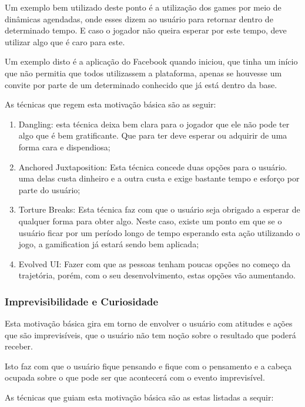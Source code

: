 Um exemplo bem utilizado deste ponto é a utilização dos games por meio de dinâmicas
agendadas, onde esses dizem ao usuário para retornar dentro de determinado tempo.
E caso o jogador não queira esperar por este tempo, deve utilizar algo que é caro
para este.

Um exemplo disto é a aplicação do Facebook quando iniciou, que tinha um início que não permitia
que todos utilizassem a plataforma, apenas se houvesse um convite por parte de um
determinado conhecido que já está dentro da base.

As técnicas que regem esta motivação básica são as seguir:

\begin{enumerate}
    \item Dangling: esta técnica deixa bem clara para o jogador que ele não pode
        ter algo que é bem gratificante. Que para ter deve esperar ou adquirir
        de uma forma cara e dispendiosa;
    \item Anchored Juxtaposition: Esta técnica concede duas opções para o usuário.
        uma delas custa dinheiro e a outra custa e exige bastante tempo e esforço
        por parte do usuário;
    \item Torture Breaks: Esta técnica faz com que o usuário seja obrigado a esperar
        de qualquer forma para obter algo. Neste caso, existe um ponto em que
        se o usuário ficar por um período longo de tempo esperando esta ação
        utilizando o jogo, a gamification já estará sendo bem aplicada;
    \item Evolved UI: Fazer com que as pessoas tenham poucas opções no começo da
        trajetória, porém, com o seu desenvolvimento, estas opções vão aumentando.
\end{enumerate}

\subsubsection{Imprevisibilidade e Curiosidade}
\label{sub:imprevisibilidadeecuriosidade}
Esta motivação básica gira em torno de envolver o usuário com atitudes e ações que são
imprevisíveis, que o usuário não tem noção sobre o resultado que poderá receber.

Isto faz com que o usuário fique pensando e fique com o pensamento e a cabeça ocupada
sobre o que pode ser que acontecerá com o evento imprevisível.

As técnicas que guiam esta motivação básica são as estas listadas a sequir:

